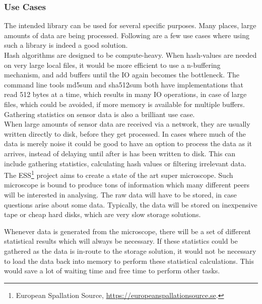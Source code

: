 \documentclass[a4paper]{article}
\begin{document}
\subsubsection{Use Cases}
The intended library can be used for several specific purposes. Many places, large amounts of data are being processed. Following are a few use cases where using such a library is indeed a good solution.\\


Hash algorithms are designed to be compute-heavy. When hash-values are needed on very large local files, it would be more efficient to use a n-buffering mechanism, and add buffers until the IO again becomes the bottleneck. The command line tools md5sum and sha512sum both have implementations that read 512 bytes at a time, which results in many IO operations, in case of large files, which could be avoided, if more memory is available for multiple buffers. Gathering statistics on sensor data is also a brilliant use case.\\


When large amounts of sensor data are received via a network, they are usually written directly to disk, before they get processed. In cases where much of the data is merely noise it could be good to have an option to process the data as it arrives, instead of delaying until after is has been written to disk. This can include gathering statistics, calculating hash values or filtering irrelevant data.\\


The ESS\footnote{European Spallation Source, \url{https://europeanspallationsource.se}.} project aims to create a state of the art super microscope. Such microscope is bound to produce tons of information which many different peers will be interested in analysing. The raw data will have to be stored, in case questions arise about some data. Typically, the data will be stored on inexpensive tape or cheap hard disks, which are very slow storage solutions. 

Whenever data is generated from the microscope, there will be a set of different  statistical results which will always be necessary. If these statistics could be gathered as the data is in-route to the storage solution, it would not be necessary to load the data back into memory to perform these statistical calculations. This would save a lot of waiting time and free time to perform other tasks.






\newpage
\end{document}
